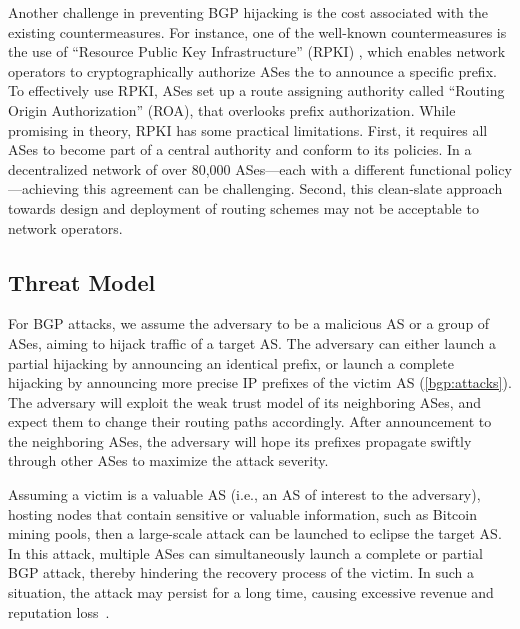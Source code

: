 \documentclass[conference]{IEEEtran}
\begin{document}
Another challenge in preventing BGP hijacking is the cost associated with the existing countermeasures. For instance, one of the well-known countermeasures is the use of ``Resource Public Key Infrastructure'' (RPKI) \cite{rfc8481}, which enables network operators to cryptographically authorize ASes the to announce a specific prefix. To effectively use RPKI, ASes set up a route assigning authority called ``Routing Origin Authorization'' (ROA), that overlooks prefix authorization. While promising in theory, RPKI has some practical limitations. First, it requires all ASes to become part of a central authority and conform to its policies. In a decentralized network of over 80,000 ASes---each with a different functional policy---achieving this agreement can be challenging. Second, this clean-slate approach towards design and deployment of routing schemes may not be acceptable to network operators. 

\subsection{Threat Model} \label{sec:tm}
For BGP attacks, we assume the adversary to be a malicious AS or a group of ASes, aiming to hijack traffic of a target AS. The adversary can either launch a partial hijacking by announcing an identical prefix, or launch a complete hijacking by announcing more precise IP prefixes of the victim AS (\textsection\ref{bgp:attacks}). The adversary will exploit the weak trust model of its neighboring ASes, and expect them to change their routing paths accordingly. After announcement to the neighboring ASes, the adversary will hope its prefixes propagate swiftly through other ASes to maximize the attack severity. 

Assuming a victim is a valuable AS (i.e., an AS of interest to the adversary), hosting nodes that contain sensitive or valuable information, such as Bitcoin mining pools, then a large-scale attack can be launched to eclipse the target AS. In this attack, multiple ASes can simultaneously launch a complete or partial BGP attack, thereby hindering the recovery process of the victim. In such a situation, the attack may persist for a long time, causing excessive revenue and reputation loss~\cite{BangeraG11}.
\end{document}
